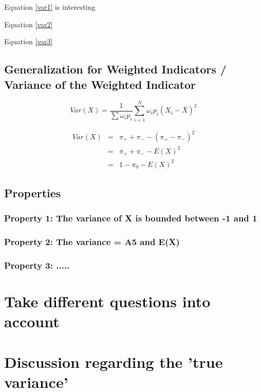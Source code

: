 \documentclass[12pt,a4paper,oneside]{book}
\begin{document}
Equation \ref{var1} is interesting 

Equation \ref{var2}

Equation \ref{var3}




\subsection{Generalization for Weighted Indicators / Variance of the Weighted Indicator}

\begin{equation}
Var(X) = \frac{1}{\sum \omega_i p_i } \sum^N _{i=1} \omega_i p_i (X_i - \bar{X})^2
\end{equation}


\begin{eqnarray}
Var(X) &=& \pi_+ + \pi_- - ( \pi_+ - \pi_- )^2 \\
	&=& \pi_+ + \pi_- - E ( X )^2 \\
	&=& 1 - \pi_0 - E(X)^2
\end{eqnarray}


\subsection{Properties}

\subsubsection{Property 1: The variance of X is bounded between -1 and 1}

\subsubsection{Property 2: The variance = A5 and E(X)}


\subsubsection{Property 3: .....}


\section{Take different questions into account}





\section{Discussion regarding the 'true variance'}
\end{document}
